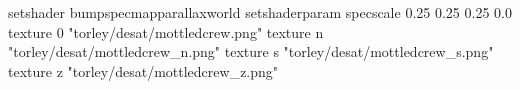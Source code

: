 setshader bumpspecmapparallaxworld
setshaderparam specscale 0.25 0.25 0.25 0.0
texture 0 "torley/desat/mottledcrew.png"
texture n "torley/desat/mottledcrew_n.png"
texture s "torley/desat/mottledcrew_s.png"
texture z "torley/desat/mottledcrew_z.png"

